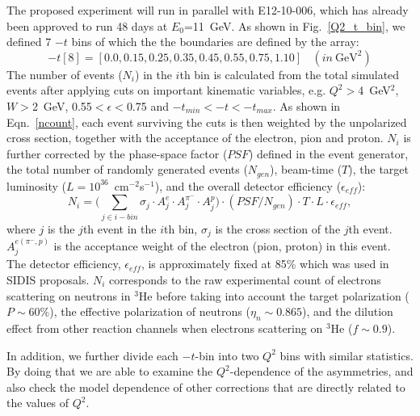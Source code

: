 The proposed experiment will run in parallel with E12-10-006, which has already
been approved to run 48 days at $E_{0}$=11~GeV.  As shown in
Fig.~\ref{Q2_t_bin}, we defined 7 $-t$ bins of which the the boundaries are
defined by the array:
 \begin{equation}
   -t[8] = [0.0, 0.15, 0.25, 0.35, 0.45, 0.55, 0.75, 1.10]~~~~(in~\mathrm{GeV^{2}})
 \end{equation}
The number of events ($N_{i}$) in the $i$th bin is calculated from the total
simulated events after applying cuts on important kinematic variables,
e.g. $Q^{2}>$4~GeV$^{2}$, $W>$2~GeV, 0.55$<\epsilon<$0.75 and
$-t_{min}<-t<-t_{max}$. As shown in Eqn.~\ref{ncount}, each event surviving the
cuts is then weighted by the unpolarized cross section, together with the
acceptance of the electron, pion and proton. $N_{i}$ is further corrected by
the phase-space factor ($PSF$) defined in the event generator, the total number
of randomly generated events ($N_{gen}$), beam-time ($T$), the target
luminosity ($L=10^{36}$~cm$^{-2}$s$^{-1}$), and the overall detector efficiency 
($\epsilon_{eff}$):
 \begin{equation}
     N_{i} = \bigl(\sum_{j\in i-bin} \sigma_{j}\cdot A^{e}_{j} \cdot
     A^{\pi^{-}}_{j} \cdot A^{p}_{j}\bigr) \cdot (PSF/N_{gen}) \cdot T \cdot L \cdot
     \epsilon_{eff},
     \label{ncount}
 \end{equation}
where $j$ is the $j$th event in the $i$th bin, $\sigma_{j}$ is the cross
section of the $j$th event. $A^{e(\pi^{-},p)}_{j}$ is the acceptance weight of the
electron (pion, proton) in this event. The detector efficiency,
$\epsilon_{eff}$, is approximately fixed at 85\% which was used in SIDIS
proposals. $N_{i}$ corresponds to the raw experimental count of electrons
scattering on neutrons in $\mathrm{^{3}He}$ before taking into account the
target polarization ($P\sim60\%$), the effective polarization of neutrons
($\eta_{n}\sim0.865$), and the dilution effect from other reaction channels
when electrons scattering on $\mathrm{^{3}He}$ ($f \sim 0.9$). 

In addition, we further divide each $-t$-bin into two $Q^{2}$ bins with similar
statistics.  By doing that we are able to examine the $Q^{2}$-dependence of the
asymmetries, and also check the model dependence of other corrections that are
directly related to the values of $Q^{2}$.

